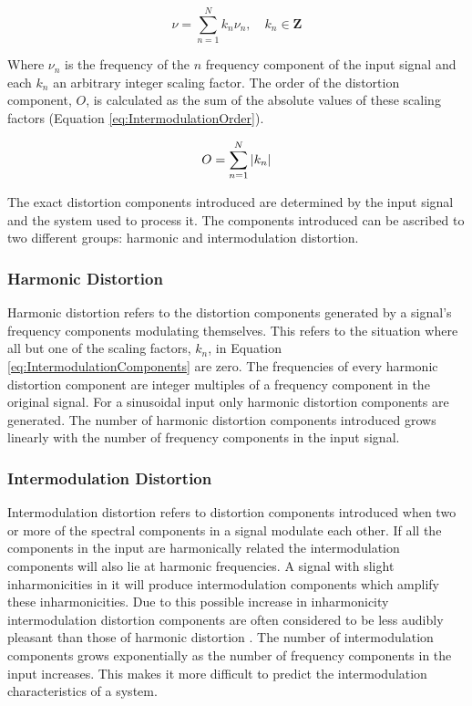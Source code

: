 		\begin{equation}
			\nu = \sum_{n = 1}^{N} k_{n}\nu_{n}, \quad k_{n} \in \textbf{Z}
			\label{eq:IntermodulationComponents}
		\end{equation}

		Where $\nu_{n}$ is the frequency of the $n$ frequency component of the input signal and each
		$k_{n}$ an arbitrary integer scaling factor. The order of the distortion component, $O$, is calculated as
		the sum of the absolute values of these scaling factors (Equation \ref{eq:IntermodulationOrder}).

		\begin{equation}
			O = \sum_{n = 1}^{N} \left|k_{n}\right|
			\label{eq:IntermodulationOrder}
		\end{equation}

		The exact distortion components introduced are determined by the input signal and the system used to process
		it. The components introduced can be ascribed to two different groups: harmonic and intermodulation
		distortion.

		\subsubsection*{Harmonic Distortion}
			Harmonic distortion refers to the distortion components generated by a signal's frequency components
			modulating themselves. This refers to the situation where all but one of the scaling factors,
			$k_{n}$, in Equation \ref{eq:IntermodulationComponents} are zero. The frequencies of every harmonic
			distortion component are integer multiples of a frequency component in the original signal. For a
			sinusoidal input only harmonic distortion components are generated. The number of harmonic
			distortion components introduced grows linearly with the number of frequency components in the input
			signal.

		\subsubsection*{Intermodulation Distortion}
			Intermodulation distortion refers to distortion components introduced when two or more of the
			spectral components in a signal modulate each other. If all the components in the input are
			harmonically related the intermodulation components will also lie at harmonic frequencies. A signal
			with slight inharmonicities in it will produce intermodulation components which amplify these
			inharmonicities. Due to this possible increase in inharmonicity intermodulation distortion
			components are often considered to be less audibly pleasant than those of harmonic distortion
			\citep{rumsey2009sound}. The number of intermodulation components grows exponentially as the number
			of frequency components in the input increases. This makes it more difficult to predict the
			intermodulation characteristics of a system.

